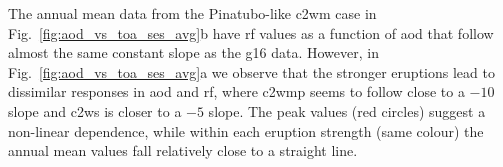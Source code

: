 \documentclass{ametsocV6.1}
\begin{document}
The annual mean data from the Pinatubo-like \gls{c2wm} case in
Fig.~\ref{fig:aod_vs_toa_ses_avg}b have \gls{rf} values as a function of \gls{aod} that
follow almost the same constant slope as the \gls{g16} data. However, in
Fig.~\ref{fig:aod_vs_toa_ses_avg}a we observe that the stronger eruptions lead to
dissimilar responses in \gls{aod} and \gls{rf}, where \gls{c2wmp} seems to follow close
to a \(-10\) slope and \gls{c2ws} is closer to a \(-5\) slope. The peak values (red
circles) suggest a non-linear dependence, while within each eruption strength (same
colour) the annual mean values fall relatively close to a straight line.
\end{document}
